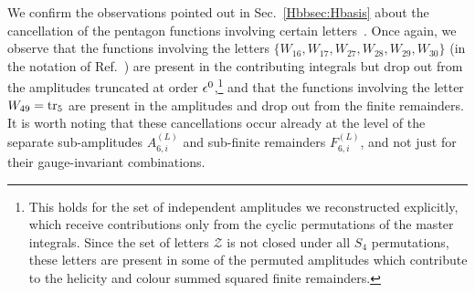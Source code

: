 \documentclass[main.tex]{subfiles}
\begin{document}
We confirm the observations pointed out in Sec.~\ref{Hbbsec:Hbasis} about the cancellation of the pentagon functions involving certain letters~\cite{Badger:2021nhg, Badger:2021ega, Abreu:2021asb}. Once again, we observe that the functions involving the letters $\{W_{16}, W_{17}, W_{27}, W_{28}, W_{29}, W_{30} \}$ (in the notation of Ref.~\cite{Abreu:2020jxa}) are present in the contributing integrals but drop out from the amplitudes truncated at order $\epsilon^0$,\footnote{This holds for the set of independent amplitudes we reconstructed explicitly, which receive contributions only from the cyclic permutations of the master integrals. Since the set of letters $\mathcal{Z}$ is not closed under all $S_4$ permutations, these letters are present in some of the permuted amplitudes which contribute to the helicity and colour summed squared finite remainders.} and that the functions involving the letter $W_{49}=\operatorname{\rm tr}_5$ are present in the amplitudes and drop out from the finite remainders. It is worth noting that these cancellations occur already at the level of the separate sub-amplitudes $A^{(L)}_{6,i}$ and sub-finite remainders $F^{(L)}_{6,i}$, and not just for their gauge-invariant combinations. 
\end{document}
